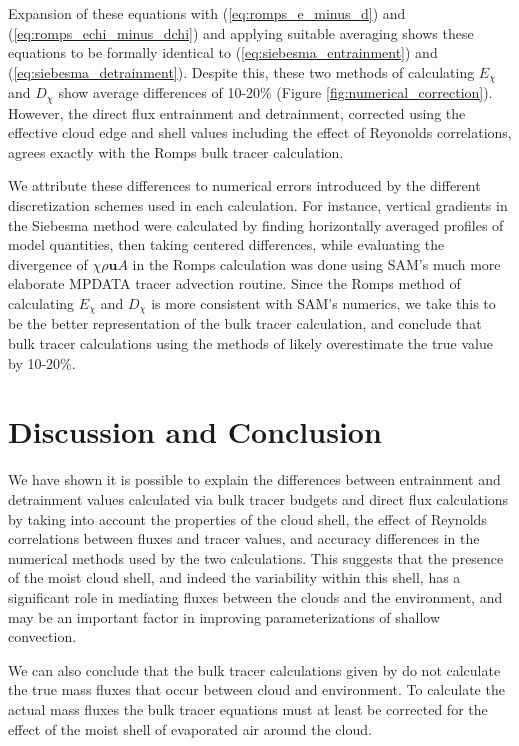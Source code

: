 \documentclass[draft,grl]{agutex}
\begin{document}
\begin{article}
Expansion of these equations with (\ref{eq:romps_e_minus_d}) and 
(\ref{eq:romps_echi_minus_dchi}) and applying suitable averaging shows these 
equations to be formally identical to (\ref{eq:siebesma_entrainment}) and 
(\ref{eq:siebesma_detrainment}).  Despite this, these two methods of 
calculating $E_{\chi}$ and $D_{\chi}$ show average differences of 10-20\%
(Figure \ref{fig:numerical_correction}).  However, the direct flux entrainment 
and detrainment, corrected using the effective cloud edge and shell values 
including the effect of Reyonolds correlations, agrees exactly with the Romps
bulk tracer calculation.

We attribute these differences to numerical errors introduced by the 
different discretization schemes used in each calculation.  For instance, 
vertical gradients in the Siebesma method were calculated by finding 
horizontally averaged profiles of model quantities, then taking centered 
differences, while evaluating the divergence of $\chi \rho \mathbf{u} A$ in 
the Romps calculation was done using SAM's much more elaborate MPDATA tracer 
advection routine.  Since the Romps method of calculating $E_{\chi}$ and 
$D_{\chi}$ is more consistent with SAM's numerics, we take this to be the 
better representation of the bulk tracer calculation, and conclude that 
bulk tracer calculations using the methods of \cite{Siebesma1995} likely 
overestimate the true value by 10-20\%.


\section{Discussion and Conclusion}

We have shown it is possible to explain the differences between entrainment and 
detrainment values calculated via bulk tracer budgets and direct flux 
calculations by taking into account the properties of the cloud shell, the 
effect of Reynolds correlations between fluxes and tracer values, and 
accuracy differences in the numerical methods used by the two calculations.
This suggests that the presence of the moist cloud shell, and indeed the 
variability within this shell, has a significant role in mediating fluxes 
between the clouds and the environment, and may be an important factor in 
improving parameterizations of shallow convection.

We can also conclude that the bulk tracer calculations given by 
\cite{Siebesma1995} do not calculate the true mass fluxes that occur between 
cloud and environment.  To calculate the actual mass fluxes the bulk tracer 
equations must at least be corrected for the effect of the moist shell of 
evaporated air around the cloud.


\end{article}
\end{document}
